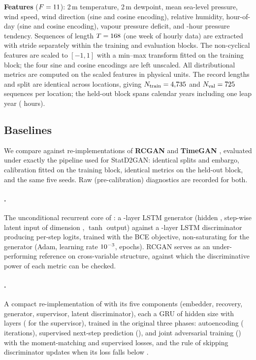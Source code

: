 \documentclass[preprint,12pt]{elsarticle}
\makeatletter
\let\ElsParagraph\paragraph
\def\StripRunInStop#1.\StripRunInMark#2\StripRunInEnd{#1}
\let\StripRunInMark\@empty
\renewcommand\paragraph[1]{\ElsParagraph{\StripRunInStop#1\StripRunInMark.\StripRunInMark\StripRunInEnd}}
\makeatother
\begin{document}
\noindent
\textbf{Features} ($F=11$): 2\,m temperature, 2\,m dewpoint, mean
sea-level pressure, wind speed, wind direction (sine and cosine
encoding), relative humidity, hour-of-day (sine and cosine encoding),
vapour pressure deficit, and \codeTendLag-hour pressure tendency.  Sequences of
length $T=168$ (one week of hourly data) are extracted with
stride \protoStride{}
separately within the training and evaluation blocks.  The \protoNScaledWord{} non-cyclical features are scaled to $[-1,1]$ with a min--max transform
fitted on the training block; the four sine and cosine encodings are
left unscaled.  All distributional metrics are computed on the
\protoNScaledWord{} scaled features in physical units.  The record lengths and split are
identical across locations, giving $N_{\text{train}} = 4{,}735$ and
$N_{\text{val}} = 725$ sequences per location; the held-out
block spans \protoValYearsWord{} calendar years including one leap year
(\protoNValHours{} hours).

\subsection{Baselines}
\label{sec:baselines}

We compare against re-implementations of \textbf{RCGAN}
\cite{esteban2017rcgan} and \textbf{TimeGAN} \cite{yoon2019timegan},
evaluated under exactly the pipeline used for StatD2GAN: identical
splits and embargo, calibration fitted on the training block, identical
metrics on the held-out block, and the same five seeds.  Raw
(pre-calibration) diagnostics are recorded for both.

\paragraph{RCGAN.}
The unconditional recurrent core of \cite{esteban2017rcgan}: a
\protoRcLayers-layer LSTM generator (hidden \protoRcHidden, step-wise
latent input of dimension \protoRcLatent, $\tanh$ output) against a
\protoRcLayers-layer LSTM discriminator producing per-step logits,
trained with the BCE objective, non-saturating for the generator (Adam,
learning rate $10^{-3}$, \protoRcEpochs{} epochs).  RCGAN serves as an
under-performing reference on cross-variable structure, against which
the discriminative power of each metric can be checked.

\paragraph{TimeGAN.}
A compact re-implementation of \cite{yoon2019timegan} with its five
components (embedder, recovery, generator, supervisor, latent
discriminator), each a GRU of hidden size \protoTgHidden{} with
\protoTgLayers{} layers (\codeTgSupLayers{} for the supervisor), trained
in the original three phases: autoencoding (\protoTgItersAe{}
iterations), supervised next-step prediction (\protoTgItersSup), and
joint adversarial training (\protoTgItersJoint) with the moment-matching
and supervised losses, and the rule of skipping discriminator updates
when its loss falls below \codeTgDThresh.
\end{document}
